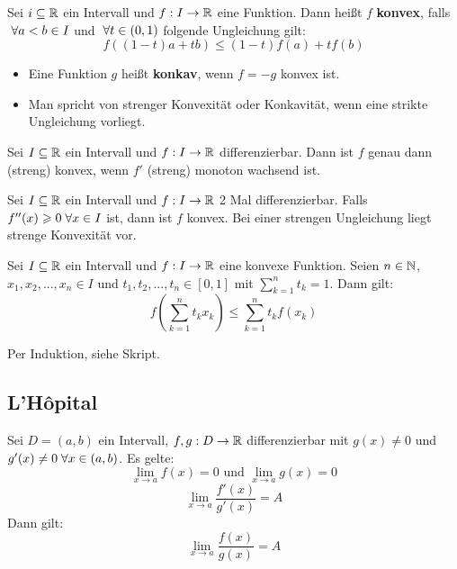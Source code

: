 \documentclass[main.tex]{subfiles}
\begin{document}
\begin{Definition}
  Sei $i \subseteq \mathbb{R}$ ein Intervall und $f:I \to \mathbb{R}$ eine Funktion. Dann heißt $f$ \textbf{konvex}, falls $\;\forall a < b \in I$ und $\;\forall t \in (0,1)$ folgende Ungleichung gilt:
  $$f((1-t)a+tb) \leq (1-t)f(a)+tf(b)$$
  \begin{itemize}
    \item Eine Funktion $g$ heißt \textbf{konkav}, wenn $f = -g$ konvex ist.
    \item Man spricht von strenger Konvexität oder Konkavität, wenn eine strikte Ungleichung vorliegt.
  \end{itemize}
\end{Definition}

\begin{Theorem}
  Sei $I \subseteq \mathbb{R}$ ein Intervall und $f: I \to \mathbb{R}$ differenzierbar. Dann ist $f$ genau dann (streng) konvex, wenn $f'$ (streng) monoton wachsend ist.
\end{Theorem}

\begin{Korollar}
  Sei $I \subseteq \mathbb{R}$ ein Intervall und $f: I \to \mathbb{R}$ 2 Mal differenzierbar. Falls $f''(x) \geqslant 0 \;\forall x \in I$ ist, dann ist $f$ konvex. Bei einer strengen Ungleichung liegt strenge Konvexität vor.
\end{Korollar}

\begin{Lemma}
  Sei $I \subseteq \mathbb{R}$ ein Intervall und $f: I \to \mathbb{R}$ eine konvexe Funktion. Seien $n \in \mathbb{N}$, $x_1,x_2,...,x_n \in I$ und $t_1, t_2, ..., t_n \in [0,1]$ mit $\sum \limits_{k=1}^n t_k = 1$. Dann gilt:
  $$f\left(\sum \limits_{k=1}^n t_k x_k\right) \leq \sum \limits_{k=1}^n t_k f(x_k)$$
\end{Lemma}

\begin{Beweis}
  Per Induktion, siehe Skript.
\end{Beweis}

\subsection{L'Hôpital}

\begin{Theorem}
  Sei $D = (a,b)$ ein Intervall, $f,g : D \to \mathbb{R}$ differenzierbar mit $g(x) \neq 0$ und $g'(x) \neq 0 \;\forall x \in (a,b)$. Es gelte:
  $$\lim \limits_{x \to a} f(x) = 0 \text{ und } \lim \limits_{x \to a} g(x) = 0$$
  $$\lim \limits_{x \to a} \dfrac{f'(x)}{g'(x)} = A$$
  Dann gilt:
  $$\lim \limits_{x \to a} \dfrac{f(x)}{g(x)} = A$$
\end{Theorem}
\end{document}
